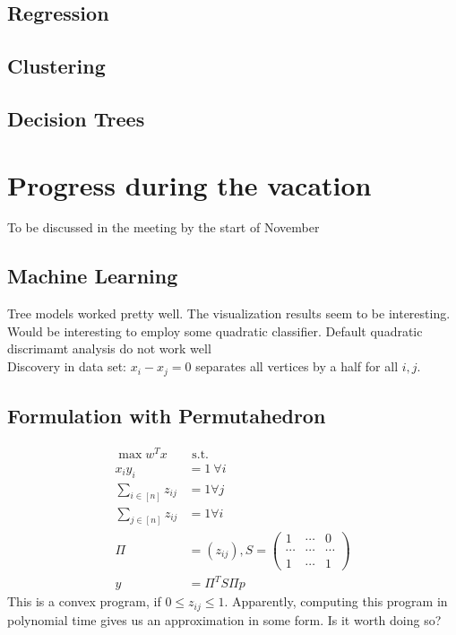 \documentclass[12pt,letterpaper]{article}
\begin{document}
\subsection{Regression}

\subsection{Clustering}

\subsection{Decision Trees}

\section{Progress during the vacation}
To be discussed in the meeting by the start of November
\subsection{Machine Learning}
Tree models worked pretty well. The visualization results seem to be interesting. 
Would be interesting to employ some quadratic classifier. Default quadratic discrimamt analysis do not work well \\
Discovery in data set: $x_i - x_j = 0$ separates all vertices by a half for all $i, j$.



\subsection{Formulation with Permutahedron}
\begin{align*}
    \max w^Tx& \text{ s.t. } \\
    x_i y_i &= 1 \ \forall i \\ 
    \sum_{i \in [n]} z_{ij} &= 1 \forall j \\
    \sum_{j \in [n]} z_{ij} &= 1 \forall i \\
    \Pi &= (z_{ij}), S = \begin{pmatrix}
        1 & \cdots & 0 \\ 
        \cdots & \cdots & \cdots \\ 
        1 & \cdots & 1
    \end{pmatrix} \\
    y &= \Pi^T S \Pi p
\end{align*}
This is a convex program, if $0 \leq z_{ij} \leq 1$. 
Apparently, computing this program in polynomial time gives 
us an approximation in some form. Is it worth doing so?
\end{document}
